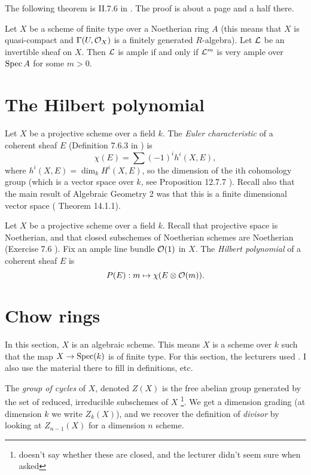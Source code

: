 The following theorem is II.7.6 in \cite{hartshorne2013algebraic}. The proof is about a page and a half there. 
\begin{theorem}\label{thm:ample-very-ample}
	Let $X$ be a scheme of finite type over a Noetherian ring $A$ (this means that $X$ is quasi-compact and $\Gamma(U, \mathcal{O}_X)$ is a finitely generated $R$-algebra). Let $\mathcal{L}$ be an invertible sheaf on $X$. Then $\mathcal{L}$ is ample if and only if $\mathcal{L}^m$ is very ample over $\operatorname{Spec} A$ for some $m > 0$. 
\end{theorem}

\section{The Hilbert polynomial}

\begin{definition}
	Let $X$ be a projective scheme over a field $k$.  The \emph{Euler characteristic} of a coherent sheaf $E$ (Definition 7.6.3 in \cite{ag2}) is \[\chi(E) = \sum (-1)^i h^i(X, E),\] where $h^i(X, E) = \dim_k H^i(X, E)$, so the dimension of the ith cohomology group (which is a vector space over $k$, see Proposition 12.7.7 \cite{ag2}). Recall also that the main result of Algebraic Geometry 2 was that this is a finite dimensional vector space (\cite{ag2} Theorem 14.1.1).

\end{definition}

\begin{definition}
	Let $X$ be a projective scheme over a field $k$. Recall that projective space is Noetherian, and that closed subschemes of Noetherian schemes are Noetherian (Exercise 7.6 \cite{ag2}).
	Fix an ample line bundle $\mathcal{O}(1)$ in $X$. The \emph{Hilbert polynomial} of a coherent sheaf $E$ is \[
    	P(E): m \mapsto \chi(E \otimes \mathcal{O}(m)).
    \]
\end{definition}



\section{Chow rings}
In this section, $X$ is an algebraic scheme. This means $X$ is a scheme over $k$ such that the map $X \to \operatorname{Spec}(k)$ is of finite type.
For this section, the lecturers used \cite{eisenbud20163264}. I also use the material there to fill in definitions, etc.

\begin{definition}
	The \emph{group of cycles} of $X$, denoted $Z(X)$ is the free abelian group generated by the set of reduced, irreducible subschemes of $X$ \footnote{\cite{eisenbud20163264} doesn't say whether these are closed, and the lecturer didn't seem sure when asked}. We get a dimension grading (at dimension $k$ we write $Z_k(X)$), and we recover the definition of \emph{divisor} by looking at  $Z_{n-1}(X)$ for a dimension $n$ scheme.
\end{definition}

